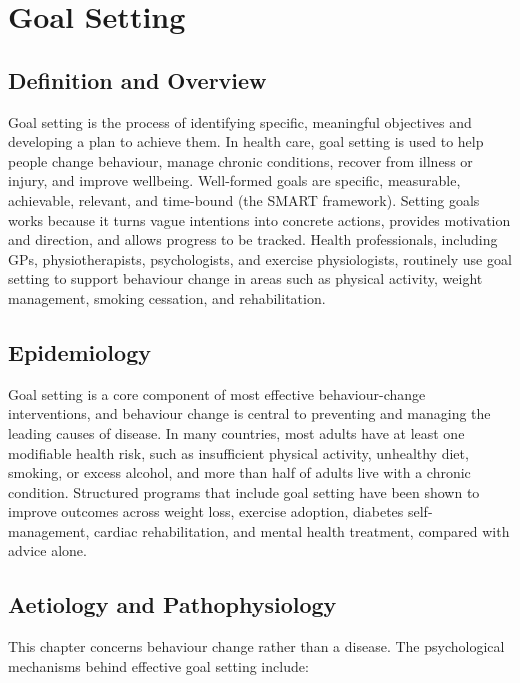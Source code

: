 \chapter{Goal Setting}

\section*{Definition and Overview}
Goal setting is the process of identifying specific, meaningful objectives and developing a plan to achieve them. In health care, goal setting is used to help people change behaviour, manage chronic conditions, recover from illness or injury, and improve wellbeing. Well-formed goals are specific, measurable, achievable, relevant, and time-bound (the SMART framework). Setting goals works because it turns vague intentions into concrete actions, provides motivation and direction, and allows progress to be tracked. Health professionals, including GPs, physiotherapists, psychologists, and exercise physiologists, routinely use goal setting to support behaviour change in areas such as physical activity, weight management, smoking cessation, and rehabilitation.

\section*{Epidemiology}
Goal setting is a core component of most effective behaviour-change interventions, and behaviour change is central to preventing and managing the leading causes of disease. In many countries, most adults have at least one modifiable health risk, such as insufficient physical activity, unhealthy diet, smoking, or excess alcohol, and more than half of adults live with a chronic condition. Structured programs that include goal setting have been shown to improve outcomes across weight loss, exercise adoption, diabetes self-management, cardiac rehabilitation, and mental health treatment, compared with advice alone.

\section*{Aetiology and Pathophysiology}
This chapter concerns behaviour change rather than a disease. The psychological mechanisms behind effective goal setting include:

